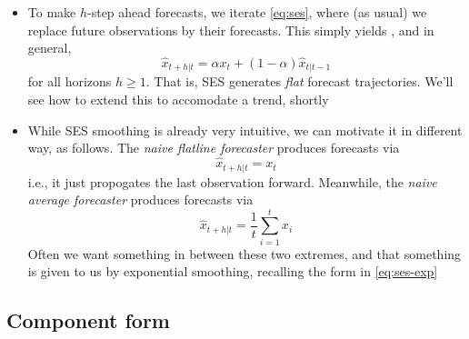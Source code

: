 \documentclass{article}
\begin{document}
\begin{itemize}
\item To make $h$-step ahead forecasts, we iterate \eqref{eq:ses}, where (as 
  usual) we replace future observations by their forecasts. This simply  
  yields , and in general, 
  \begin{equation}
  \label{eq:ses-h}
  \hat{x}_{t+h | t} = \alpha x_t + (1-\alpha) \hat{x}_{t | t-1}
  \end{equation}
  for all horizons $h \geq 1$. That is, SES generates \emph{flat} forecast
  trajectories. We'll see how to extend this to accomodate a trend, shortly  

\item While SES smoothing is already very intuitive, we can motivate it in
  different way, as follows. The \emph{naive flatline forecaster} produces
  forecasts via
  \begin{equation}
  \label{eq:flatline-h}
  \hat{x}_{t+h | t} = x_t 
  \end{equation}
  i.e., it just propogates the last observation forward. Meanwhile, the
  \emph{naive average forecaster} produces forecasts via
  \begin{equation}
  \label{eq:average-h}
  \hat{x}_{t+h | t} = \frac{1}{t} \sum_{i=1}^t x_i
  \end{equation}
  Often we want something in between these two extremes, and that something is  
  given to us by exponential smoothing, recalling the form in \eqref{eq:ses-exp} 
\end{itemize}

\subsection{Component form}
\end{document}
